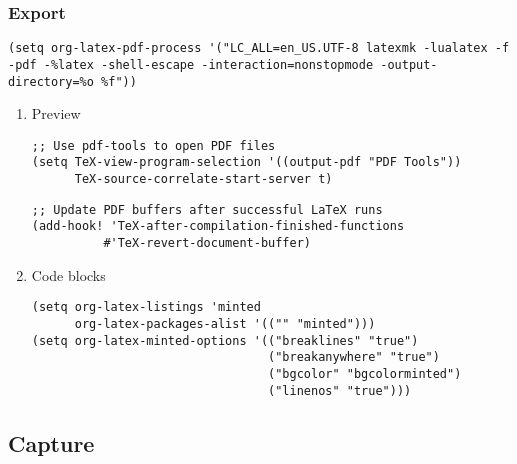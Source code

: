 \documentclass[c]{article}
\theoremstyle{plain}%
\theoremstyle{definition}
\theoremstyle{remark}
\begin{document}
\subsubsection{Export}
\label{sec:org1a59de4}
\begin{verbatim}
(setq org-latex-pdf-process '("LC_ALL=en_US.UTF-8 latexmk -lualatex -f -pdf -%latex -shell-escape -interaction=nonstopmode -output-directory=%o %f"))
\end{verbatim}
\begin{enumerate}
\item Preview
\label{sec:org1b07478}
\begin{verbatim}
;; Use pdf-tools to open PDF files
(setq TeX-view-program-selection '((output-pdf "PDF Tools"))
      TeX-source-correlate-start-server t)
\end{verbatim}
\begin{verbatim}
;; Update PDF buffers after successful LaTeX runs
(add-hook! 'TeX-after-compilation-finished-functions
          #'TeX-revert-document-buffer)
\end{verbatim}
\item Code blocks
\label{sec:org16ccf46}
\begin{verbatim}
(setq org-latex-listings 'minted
      org-latex-packages-alist '(("" "minted")))
(setq org-latex-minted-options '(("breaklines" "true")
                                 ("breakanywhere" "true")
                                 ("bgcolor" "bgcolorminted")
                                 ("linenos" "true")))
\end{verbatim}
\end{enumerate}
\subsection{Capture}
\label{sec:org4fc88b5}
\end{document}
